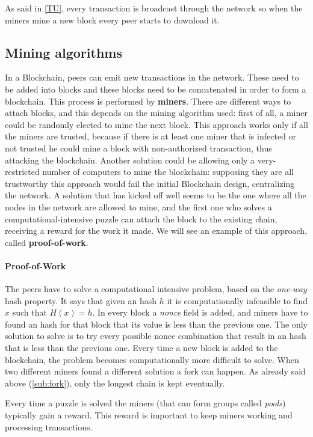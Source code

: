 As said in \ref{TU}, every transaction is broadcast through the network so when
the miners mine a new block every peer starts to download it.

\subsection{Mining algorithms}
In a Blockchain, peers can emit new transactions in the network. These
need to be added into blocks and these blocks need to be concatenated in order
to form a blockchain. This process is performed by \textbf{miners}.
There are different ways to attach blocks, and this depends on the mining
algorithm used: first of all, a miner could be randomly elected to mine the
next block. This approach works only if all the miners are trusted, because if
there is at least one miner that is infected or not trusted he could mine a
block with non-authorized transaction, thus attacking the blockchain. Another
solution could be allowing only a very-restricted number of computers to mine
the blockchain: supposing they are all trustworthy this approach would fail the
initial Blockchain design, centralizing the network.
A solution that has kicked off well seems to be the one where all the nodes in
the network are allowed to mine, and the first one who solves a
computational-intensive puzzle can attach the block to the existing chain,
receiving a reward for the work it made. We will see an example of this
approach, called \textbf{proof-of-work}.


\paragraph{Proof-of-Work}

The peers have to solve a computational intensive problem, based on the
\textit{one-way} hash property. It says that given an hash $h$ it is
computationally infeasible to find $x$ such that $H(x) = h$.
In every block a \textit{nonce} field is added, and miners have to found an
hash for that block that its value is less than the previous one\cite{sok15}.
The only solution to solve is to try every possible nonce combination that
result in an hash that is less than the previous one. Every time a new block is
added to the blockchain, the problem becomes computationally more difficult to
solve.
When two different miners found a different solution a fork can happen. As
already said above (\ref{sub:fork}), only the longest chain is kept eventually.

Every time a puzzle is solved the miners (that can form groups called
\textit{pools}) typically gain a reward. This reward is important to keep miners
working and processing transactions.

